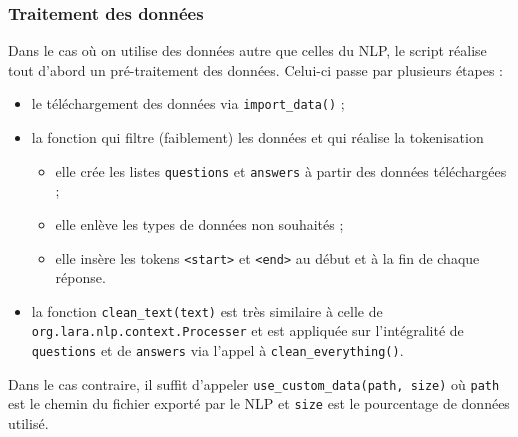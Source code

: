 \documentclass[10pt,a4paper]{article}
\begin{document}
\subsubsection{Traitement des données}
Dans le cas où on utilise des données autre que celles du NLP, le script réalise tout d'abord un pré-traitement des données. Celui-ci passe par plusieurs étapes :
\begin{itemize}
	\item le téléchargement des données via \texttt{import\_data()} ;
	\item la fonction qui filtre (faiblement) les données et qui réalise la tokenisation
	      \begin{itemize}
		      \item elle crée les listes \texttt{questions} et \texttt{answers} à partir des données téléchargées ;
		      \item elle enlève les types de données non souhaités ;
		      \item elle insère les tokens \texttt{<start>} et \texttt{<end>} au début et à la fin de chaque réponse.
	      \end{itemize}
	\item la fonction \texttt{clean\_text(text)} est très similaire à celle de \texttt{org.lara.nlp.context.Processer} et est appliquée sur l'intégralité de \texttt{questions} et de \texttt{answers} via l'appel à \texttt{clean\_everything()}.
\end{itemize}
Dans le cas contraire, il suffit d'appeler \texttt{use\_custom\_data(path, size)} où \texttt{path} est le chemin du fichier exporté par le NLP et \texttt{size} est le pourcentage de données utilisé.
\end{document}
